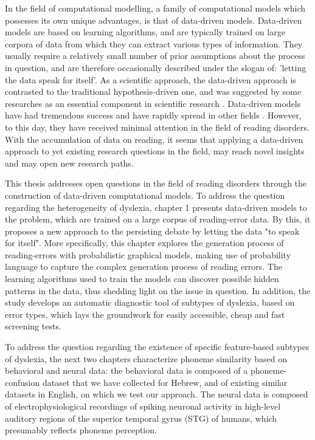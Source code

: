 In the field of computational modelling, a family of computational models which possesses its own unique advantages, is that of data-driven models. Data-driven models are based on learning algorithms, and are typically trained on large corpora of data from which they can extract various types of information. They usually require a relatively small number of prior assumptions about the process in question, and are therefore occasionally described under the slogan of: 'letting the data speak for itself'. As a scientific approach, the data-driven approach is contrasted to the traditional hypothesis-driven one, and was suggested by some researches as an essential component in scientific research \citep{kell2004here}. Data-driven models have had tremendous success and have rapidly spread in other fields \citep{bell2009beyond, leonelli2014difference, lecun2015deep}. However, to this day, they have received minimal attention in the field of reading disorders. With the accumulation of data on reading, it seems that applying a data-driven approach to yet existing research questions in the field, may reach novel insights and may open new research paths.

This thesis addresses open questions in the field of reading disorders through the construction of data-driven computational models. To address the question regarding the heterogeneity of dyslexia, chapter 1 presents data-driven models to the problem, which are trained on a large corpus of reading-error data. By this, it proposes a new approach to the persisting debate by letting the data "to speak for itself". More specifically, this chapter explores the generation process of reading-errors with probabilistic graphical models, making use of probability language to capture the complex generation process of reading errors. The learning algorithms used to train the models can discover possible hidden patterns in the data, thus shedding light on the issue in question. In addition, the study develops an automatic diagnostic tool of subtypes of dyslexia, based on error types, which lays the groundwork for easily accessible, cheap and fast screening tests. 

To address the question regarding the existence of specific feature-based subtypes of dyslexia, the next two chapters characterize phoneme similarity based on behavioral and neural data: the behavioral data is composed of a phoneme-confusion dataset that we have collected for Hebrew, and of existing similar datasets in English, on which we test our approach. The neural data is composed of electrophysiological recordings of spiking neuronal activity in high-level auditory regions of the superior temporal gyrus (STG) of humans, which presumably reflects phoneme perception. 

